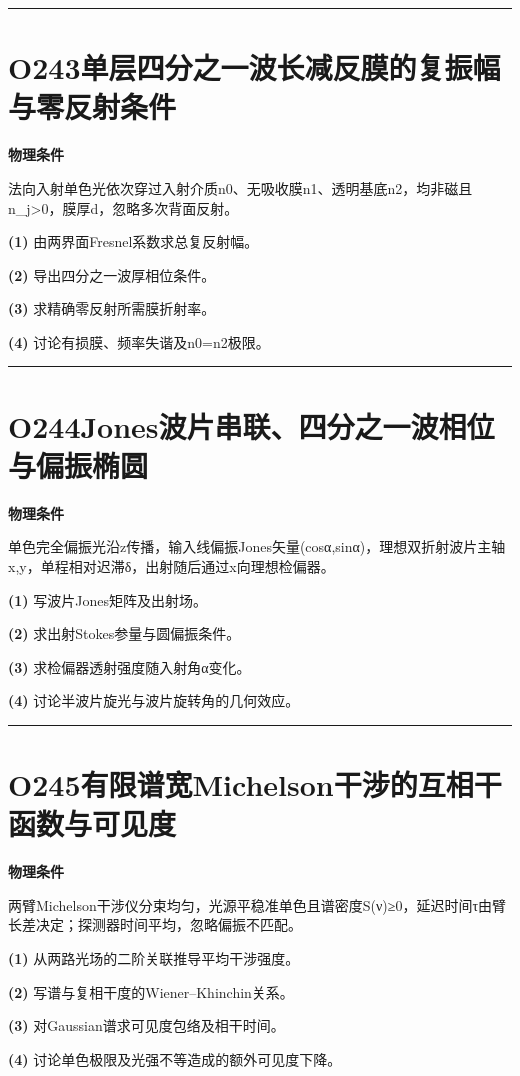 \documentclass[UTF8,a4paper,11pt,oneside,openany]{ctexbook}
\begin{document}
\par\bigskip\hrule\bigskip
\section*{O243\quad 单层四分之一波长减反膜的复振幅与零反射条件}
\textbf{物理条件}\par 法向入射单色光依次穿过入射介质n0、无吸收膜n1、透明基底n2，均非磁且n\_j>0，膜厚d，忽略多次背面反射。
\par\noindent\textbf{(1)} 由两界面Fresnel系数求总复反射幅。
\par\noindent\textbf{(2)} 导出四分之一波厚相位条件。
\par\noindent\textbf{(3)} 求精确零反射所需膜折射率。
\par\noindent\textbf{(4)} 讨论有损膜、频率失谐及n0=n2极限。

\par\bigskip\hrule\bigskip
\section*{O244\quad Jones波片串联、四分之一波相位与偏振椭圆}
\textbf{物理条件}\par 单色完全偏振光沿z传播，输入线偏振Jones矢量(cosα,sinα)，理想双折射波片主轴x,y，单程相对迟滞δ，出射随后通过x向理想检偏器。
\par\noindent\textbf{(1)} 写波片Jones矩阵及出射场。
\par\noindent\textbf{(2)} 求出射Stokes参量与圆偏振条件。
\par\noindent\textbf{(3)} 求检偏器透射强度随入射角α变化。
\par\noindent\textbf{(4)} 讨论半波片旋光与波片旋转角的几何效应。

\par\bigskip\hrule\bigskip
\section*{O245\quad 有限谱宽Michelson干涉的互相干函数与可见度}
\textbf{物理条件}\par 两臂Michelson干涉仪分束均匀，光源平稳准单色且谱密度S(ν)≥0，延迟时间τ由臂长差决定；探测器时间平均，忽略偏振不匹配。
\par\noindent\textbf{(1)} 从两路光场的二阶关联推导平均干涉强度。
\par\noindent\textbf{(2)} 写谱与复相干度的Wiener–Khinchin关系。
\par\noindent\textbf{(3)} 对Gaussian谱求可见度包络及相干时间。
\par\noindent\textbf{(4)} 讨论单色极限及光强不等造成的额外可见度下降。
\end{document}
